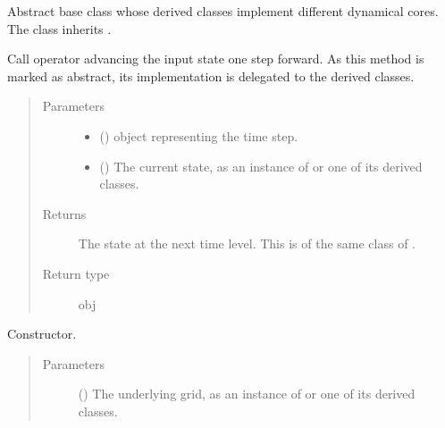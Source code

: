 \documentclass[letterpaper,10pt,english]{sphinxmanual}
\begin{document}
\begin{fulllineitems}
\label{\detokenize{api:dycore.dycore.DynamicalCore}}
Abstract base class whose derived classes implement different dynamical cores.
The class inherits .

\begin{fulllineitems}
\label{\detokenize{api:dycore.dycore.DynamicalCore.__call__}}
Call operator advancing the input state one step forward.
As this method is marked as abstract, its implementation is delegated to the derived classes.
\begin{quote}\begin{description}
\item[{Parameters}] \leavevmode\begin{itemize}
\item {} 
 () \textendash{}  object representing the time step.

\item {} 
 () \textendash{} The current state, as an instance of {\hyperref[\detokenize{api:storages.grid_data.GridData}]{}} or one of its derived classes.

\end{itemize}

\item[{Returns}] \leavevmode
The state at the next time level. This is of the same class of .

\item[{Return type}] \leavevmode
obj

\end{description}\end{quote}

\end{fulllineitems}


\begin{fulllineitems}
\label{\detokenize{api:dycore.dycore.DynamicalCore.__init__}}
Constructor.
\begin{quote}\begin{description}
\item[{Parameters}] \leavevmode
{} () \textendash{} The underlying grid, as an instance of {\hyperref[\detokenize{api:grids.grid_xyz.GridXYZ}]{}} or one of its derived classes.


\end{description}
\end{quote}
\end{fulllineitems}
\end{fulllineitems}
\end{document}
